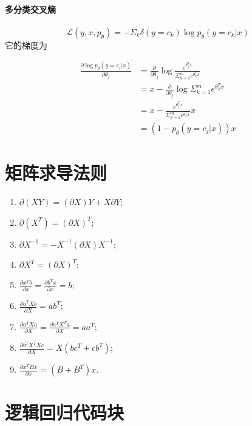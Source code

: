 \paragraph{多分类交叉熵}
$$\mathcal L(y,x,p_\theta) = -\Sigma_k \delta(y=c_k)\log p_\theta(y=c_k|x)$$
它的梯度为

\begin{equation}
\nonumber
  \begin{aligned}
    \displaystyle \frac{\partial\log p_\theta(y=c_j|x)}{\partial \theta_j} & = \frac{\partial}{\partial\theta_j}\log \frac{e^{\theta_j^Tx}}{\Sigma_{k=1}^me^{\theta_k^Tx}} \\
    &= x - \frac{\partial}{\partial\theta_j}\log \Sigma_{k=1}^m e^{\theta^T_kx} \\
    & = x - \frac{e^{\theta_j^Tx}}{\Sigma_{k=1}^m e^{\theta_k^T x}}x \\
    & = (1-p_\theta(y=c_j|x))x
  \end{aligned}
\end{equation}

\newpage
\appendix

\section{矩阵求导法则}
\label{matrix gradient}
\begin{enumerate}
  \item $\partial (XY) = (\partial X)Y + X\partial Y$;
  \item $\partial (X^T) = (\partial X)^T;$
  \item $\partial X^{-1} = -X^{-1}(\partial X)X^{-1}$;
  \item $\partial X^T = (\partial X)^T$;
  \item $\displaystyle \frac{\partial x^T b}{\partial x} = \displaystyle\frac{\partial b^T x}{\partial x} = b$;
  \item $\displaystyle \frac{\partial a^TXb}{\partial X} = ab^T$;
  \item $\displaystyle \frac{\partial a^TXa}{\partial X} = \frac{\partial a^TX^Ta}{\partial X} = aa^T;$
  \item $\displaystyle \frac{\partial b^TX^TXc}{\partial X} = X(bc^T+cb^T)$;
  \item $\displaystyle \frac{\partial x^TBx}{\partial x} = (B+B^T)x$.
\end{enumerate}
\section{逻辑回归代码块}
